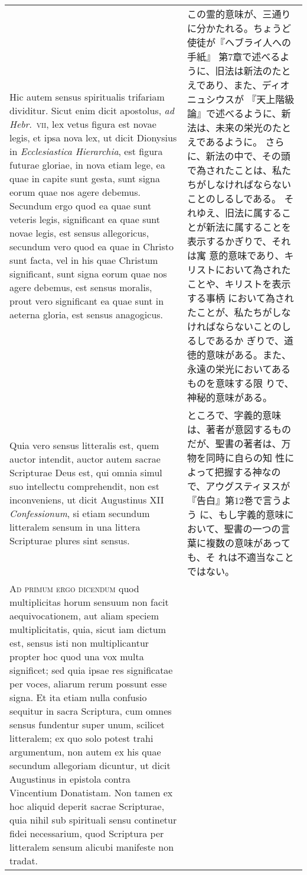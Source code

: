 \documentclass[10pt]{jsarticle} %
\begin{document}
\begin{longtable}{p{21em}p{21em}}
\\


Hic autem sensus spiritualis
trifariam dividitur. Sicut enim dicit apostolus, {\itshape ad Hebr}.~{\scshape vii}, lex vetus
figura est novae legis, et ipsa nova lex, ut dicit Dionysius in
{\itshape Ecclesiastica Hierarchia}, est figura futurae gloriae, in nova etiam
lege, ea quae in capite sunt gesta, sunt signa eorum quae nos agere
debemus. Secundum ergo quod ea quae sunt veteris legis, significant ea
quae sunt novae legis, est sensus allegoricus, secundum vero quod ea
quae in Christo sunt facta, vel in his quae Christum significant, sunt
signa eorum quae nos agere debemus, est sensus moralis, prout vero
significant ea quae sunt in aeterna gloria, est sensus anagogicus. 



&

この霊的意味が、三通りに分かたれる。ちょうど使徒が『ヘブライ人への手紙』
 第7章で述べるように、旧法は新法のたとえであり、また、ディオニュシウスが
 『天上階級論』で述べるように、新法は、未来の栄光のたとえであるように。
 さらに、新法の中で、その頭で為されたことは、私たちがしなければならない
 ことのしるしである。
それゆえ、旧法に属することが新法に属することを表示するかぎりで、それは寓
 意的意味であり、キリストにおいて為されたことや、キリストを表示する事柄
 において為されたことが、私たちがしなければならないことのしるしであるか
 ぎりで、道徳的意味がある。また、永遠の栄光においてあるものを意味する限
 りで、神秘的意味がある。



\\


Quia
vero sensus litteralis est, quem auctor intendit, auctor autem sacrae
Scripturae Deus est, qui omnia simul suo intellectu comprehendit, non
est inconveniens, ut dicit Augustinus XII {\itshape Confessionum}, si etiam
secundum litteralem sensum in una littera Scripturae plures sint sensus.


&

ところで、字義的意味は、著者が意図するものだが、聖書の著者は、万物を同時に自らの知
 性によって把握する神なので、アウグスティヌスが『告白』第12巻で言うよう
 に、もし字義的意味において、聖書の一つの言葉に複数の意味があっても、そ
 れは不適当なことではない。


\\


{\scshape Ad primum ergo dicendum} quod multiplicitas
horum sensuum non facit aequivocationem, aut aliam speciem
multiplicitatis, quia, sicut iam dictum est, sensus isti non
multiplicantur propter hoc quod una vox multa significet; sed quia ipsae
res significatae per voces, aliarum rerum possunt esse signa. Et ita
etiam nulla confusio sequitur in sacra Scriptura, cum omnes sensus
fundentur super unum, scilicet litteralem; ex quo solo potest trahi
argumentum, non autem ex his quae secundum allegoriam dicuntur, ut dicit
Augustinus in epistola contra Vincentium Donatistam. Non tamen ex hoc
aliquid deperit sacrae Scripturae, quia nihil sub spirituali sensu
continetur fidei necessarium, quod Scriptura per litteralem sensum
alicubi manifeste non tradat.



\end{longtable}
\end{document}
